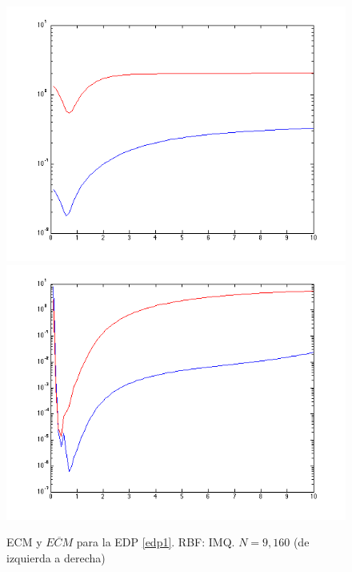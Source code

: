 \documentclass[11pt,a4paper]{article}
\begin{document}
\begin{figure}[H]
\includegraphics[scale=.45]{est_1_9_imq.png}
\includegraphics[scale=.45]{est_1_169_imq.png}
\caption{ECM y $\overline{ECM}$ para la EDP \ref{edp1}. RBF: IMQ. $N=9,160$ (de izquierda a derecha)}
\label{estimacion1}
\end{figure}
\end{document}
